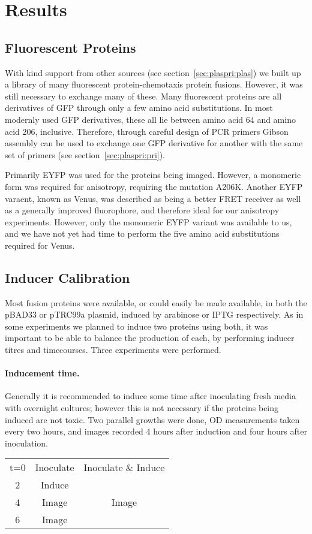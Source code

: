 \documentclass[../main.tex]{subfiles}
\begin{document}
\section{Results}


\subsection{Fluorescent Proteins}

With kind support from other sources (see section~\ref{sec:plaspri:plas}) we built up a library of many fluorescent protein-chemotaxis protein fusions. However, it was still necessary to exchange many of these. Many fluorescent proteins are all derivatives of GFP through only a few amino acid substitutions\cite{tsien98}. In most modernly used GFP derivatives, these all lie between amino acid 64 and amino acid 206, inclusive. Therefore, through careful design of PCR primers Gibson assembly can be used to exchange one GFP derivative for another with the same set of primers (see section~\ref{sec:plaspri:pri}).

Primarily EYFP was used for the proteins being imaged. However, a monomeric form was required for anisotropy\cite{vaknin07}, requiring the mutation A206K. Another EYFP varaent, known as Venus, was described as being a better FRET receiver\cite{nagai02} as well as a generally improved fluorophore, and therefore ideal for our anisotropy experiments. However, only the monomeric EYFP variant was available to us, and we have not yet had time to perform the five amino acid substitutions required for Venus.

\subsection{Inducer Calibration}

Most fusion proteins were available, or could easily be made available, in both the pBAD33 or pTRC99a plasmid, induced by arabinose or IPTG respectively. As in some experiments we planned to induce two proteins using both, it was important to be able to balance the production of each, by performing inducer titres and timecourses. Three experiments were performed.

\paragraph{Inducement time.} Generally it is recommended to induce some time after inoculating fresh media with overnight cultures; however this is not necessary if the proteins being induced are not toxic. Two parallel growths were done, OD measurements taken every two hours, and images recorded 4 hours after induction and four hours after inoculation.
\begin{center}
\begin{tabular}{ccc}
t=0	&	Inoculate	&	Inoculate \& Induce\\
2	&	Induce	&\\
4	&	Image	&	Image\\
6	&	Image	&
\end{tabular}
\end{center}
\end{document}
